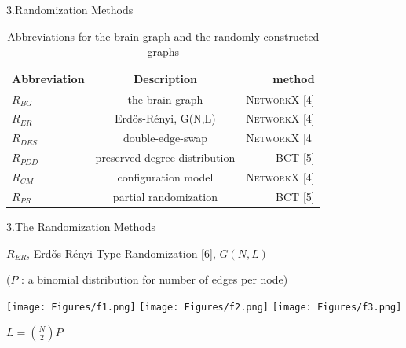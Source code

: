 \documentclass{beamer}
\begin{document}
\begin{frame}{3.Randomization Methods}
	\begin{table}[h]
		\begin{center}
\caption[Abbreviations of Randomization Methods]{Abbreviations for the brain graph and the randomly constructed graphs }
\begin{tabular}{ l | c | r }
  Abbreviation & Description & method \\
  \hline  \hline                     
  $R_{BG}$ & the brain graph               & \textsc{NetworkX} {\color{blue} [4] }  \\ \hline
  $R_{ER}$ & Erd\H{o}s-R\'{e}nyi, G(N,L)   & \textsc{NetworkX}{\color{blue} [4] } \\ \hline
  $R_{DES}$ & double-edge-swap             & \textsc{NetworkX}{\color{blue} [4] } \\ \hline
  $R_{PDD}$ & preserved-degree-distribution& \textsc{BCT} {\color{blue} [5] }	 \\ \hline  
  $R_{CM}$ & configuration model       	   & \textsc{NetworkX}{\color{blue} [4] } \\ \hline
  $R_{PR}$ & partial randomization         & \textsc{BCT}{\color{blue} [5] } 	 \\ \hline  
  \hline  
\end{tabular}
\label{table:Abbreviations of Randomization Methods}
		\end{center}
	\end{table}	

\end{frame}


\begin{frame}{3.The Randomization Methods}

\footnotesize{$R_{ER}$, Erd\H{o}s-R\'{e}nyi-Type Randomization {\color{blue} [6]}, $G(N,L)$} 

($P$ : a binomial distribution for number of edges per node) 

	\texttt{[image: Figures/f1.png]}  
	\texttt{[image: Figures/f2.png]} 
    \texttt{[image: Figures/f3.png]}


$ L = \binom {N} {2}P $

\end{frame}
\end{document}
